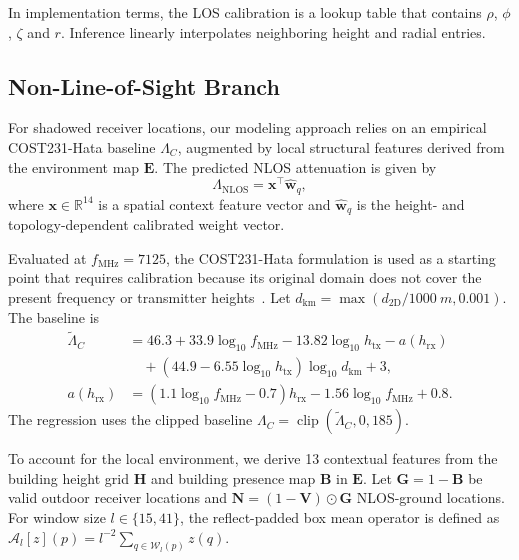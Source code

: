 \documentclass[10pt,conference,letterpaper]{IEEEtran}
\begin{document}
In implementation terms, the LOS calibration is a lookup table that contains $\rho$, $\phi$, $\zeta$ and $r$. Inference linearly interpolates neighboring height and radial entries.

\subsection{Non-Line-of-Sight Branch}
\label{sec:nlos}

For shadowed receiver locations, our modeling approach relies on an empirical
COST231-Hata baseline $\Lambda_C$, augmented by local structural features
derived from the environment map $\mathbf E$. The predicted NLOS attenuation
is given by
\begin{equation}
\Lambda_{\mathrm{NLOS}}=\mathbf x^\top\hat{\mathbf w}_q,
\label{eq:pl_nlos}
\end{equation}
where $\mathbf x\in\mathbb R^{14}$ is a spatial context feature vector and
$\hat{\mathbf w}_q$ is the height- and topology-dependent calibrated weight
vector.

Evaluated at $f_{\mathrm{MHz}}=7125$, the COST231-Hata formulation is used as a
starting point that requires calibration because its original domain does not
cover the present frequency or transmitter heights~\cite{cost231}. Let
$d_{\mathrm{km}}=\max(d_{\mathrm{2D}}/\SI{1000}{m},0.001)$. The baseline is
\begin{align}
\widetilde\Lambda_C &= 46.3 + 33.9 \log_{10} f_{\mathrm{MHz}}
- 13.82 \log_{10} h_{\mathrm{tx}} - a(h_{\mathrm{rx}}) \nonumber \\
&\quad +(44.9-6.55\log_{10}h_{\mathrm{tx}})\log_{10}d_{\mathrm{km}}+3,\\
a(h_{\mathrm{rx}})&=(1.1\log_{10}f_{\mathrm{MHz}}-0.7)h_{\mathrm{rx}}
-1.56\log_{10}f_{\mathrm{MHz}}+0.8.
\label{eq:cost}
\end{align}
The regression uses the clipped baseline
$\Lambda_C=\operatorname{clip}(\widetilde\Lambda_C,0,185)$.

To account for the local environment, we derive 13 contextual features from
the building height grid $\mathbf H$ and building presence map $\mathbf B$ in
$\mathbf E$. Let $\mathbf G=1-\mathbf B$ be valid outdoor receiver locations
and $\mathbf N=(1-\mathbf V)\odot\mathbf G$ NLOS-ground locations. For window
size $l\in\{15,41\}$, the reflect-padded box mean operator is defined as
$\mathcal A_l[z](p)=l^{-2}\sum_{q\in\mathcal W_l(p)}z(q)$.
\end{document}

